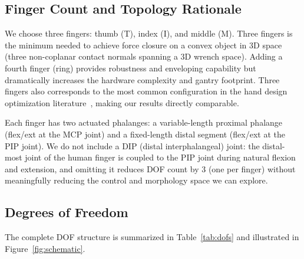 \documentclass[journal]{IEEEtran}
\begin{document}
\subsection{Finger Count and Topology Rationale}

We choose three fingers: thumb (T), index (I), and middle (M).
Three fingers is the minimum needed to achieve force closure on a convex object in 3D
space (three non-coplanar contact normals spanning a 3D wrench space).
Adding a fourth finger (ring) provides robustness and enveloping capability but
dramatically increases the hardware complexity and gantry footprint.
Three fingers also corresponds to the most common configuration in the hand design
optimization literature~\cite{hazard2020automated, pollard2021complex}, making our
results directly comparable.

Each finger has two actuated phalanges: a variable-length proximal phalange (flex/ext at
the MCP joint) and a fixed-length distal segment (flex/ext at the PIP joint).
We do not include a DIP (distal interphalangeal) joint: the distal-most joint of the human
finger is coupled to the PIP joint during natural flexion and extension, and omitting it reduces DOF count by 3 (one per finger) without meaningfully reducing the
control and morphology space we can explore.

\subsection{Degrees of Freedom}

The complete DOF structure is summarized in Table~\ref{tab:dofs} and illustrated in
Figure~\ref{fig:schematic}.

\begin{table}[t]
  \centering
  \caption{Degrees of Freedom per Finger, Morphological Role, and Actuator Type}
  \label{tab:dofs}
\end{table}
\end{document}
